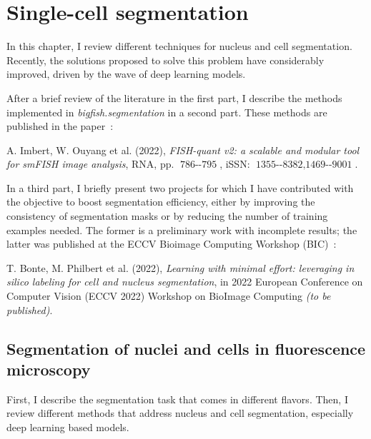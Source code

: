 
\graphicspath{{./figures/chapter3/}}

\chapter{Single-cell segmentation}
\label{ch:chapter3}

\minitoc
\newpage

In this chapter, I review different techniques for nucleus and cell segmentation.
Recently, the solutions proposed to solve this problem have considerably improved, driven by the wave of deep learning models.

After a brief review of the literature in the first part, I describe the methods implemented in \emph{bigfish.segmentation} in a second part.
These methods are published in the paper~\cite{Imbert_fq_2022}:

\begin{center}
	\color{green}
	A. Imbert, W. Ouyang et al. (2022), \textit{FISH-quant v2: a scalable and modular tool for smFISH image analysis}, RNA, pp. $\operatorname{786--795}$, iSSN: $\operatorname{1355--8382, 1469--9001}$.
\end{center}

In a third part, I briefly present two projects for which I have contributed with the objective to boost segmentation efficiency, either by improving the consistency of segmentation masks or by reducing the number of training examples needed.
The former is a preliminary work with incomplete results; the latter was published at the ECCV Bioimage Computing Workshop (BIC)~\cite{Bonte_2022}:

\begin{center}
	\color{green}
	T. Bonte, M. Philbert et al. (2022), \textit{Learning with minimal effort: leveraging in silico labeling for cell and nucleus segmentation}, in 2022 European Conference on Computer Vision (ECCV 2022) Workshop on BioImage Computing \textit{(to be published)}.
\end{center}

\section{Segmentation of nuclei and cells in fluorescence microscopy}
\label{sec:segmentation_introduction}

First, I describe the segmentation task that comes in different flavors. 
Then, I review different methods that address nucleus and cell segmentation, especially deep learning based models.

